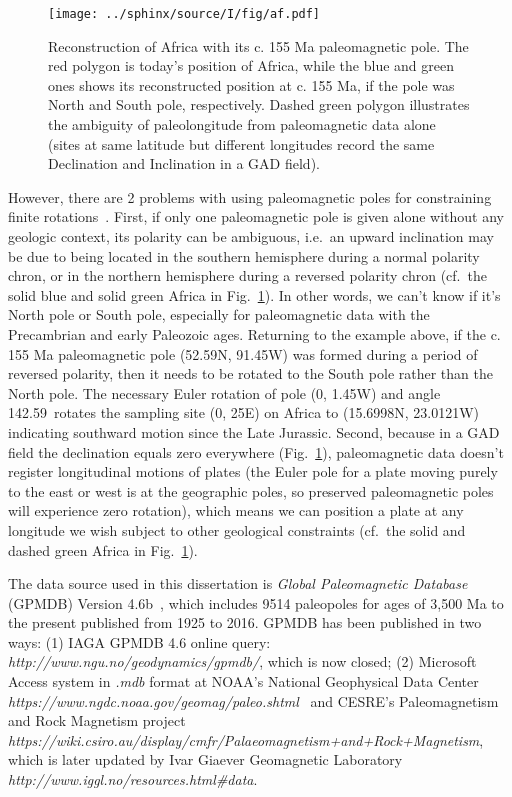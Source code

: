 \begin{figure}
  \centering
    \texttt{[image: ../sphinx/source/I/fig/af.pdf]}
  \captionsetup{width=.95\textwidth}
  \caption{Reconstruction of Africa with its c. 155 Ma paleomagnetic pole. The
  red polygon is today's position of Africa, while the blue and green ones shows
  its reconstructed position at c. 155 Ma, if the pole was North and South pole,
  respectively. Dashed green polygon illustrates the ambiguity of paleolongitude
  from paleomagnetic data alone (sites at same latitude but different longitudes
  record the same Declination and Inclination in a GAD
  field).}\label{Fig:chap_intro_reconstructpole}
\end{figure}

However, there are 2 problems with using paleomagnetic poles for constraining
finite rotations~\cite{T19}. First, if only one paleomagnetic pole is
given alone without any geologic context, its polarity can be ambiguous, i.e.\
an upward inclination may be due to being located in the southern hemisphere
during a normal polarity chron, or in the northern hemisphere during a reversed
polarity chron (cf.\ the solid blue and solid green Africa in Fig.~\ref{Fig:chap_intro_reconstructpole}). In other words, we can't know if it's North pole
or South pole, especially for paleomagnetic data with the Precambrian and early
Paleozoic ages. Returning to the example above, if the c. 155 Ma paleomagnetic
pole (52.59\degree{}N, 91.45\degree{}W) was formed during a period of reversed polarity, then
it needs to be rotated to the South pole rather than the North pole. The
necessary Euler rotation of pole (0\degree, 1.45\degree{}W) and angle
142.59\degree\ rotates the sampling site (0\degree, 25\degree{}E) on Africa to
(15.6998\degree{}N, 23.0121\degree{}W) indicating
southward motion since the Late Jurassic. Second, because in a GAD field the
declination equals zero everywhere (Fig.~\ref{Fig:chap_intro_reconstructpole}),
paleomagnetic data doesn't register longitudinal motions of plates (the Euler
pole for a plate moving purely to the east or west is at the geographic poles,
so preserved paleomagnetic poles will experience zero rotation), which means we
can position a plate at any longitude we wish subject to other geological
constraints (cf.\ the solid and dashed green Africa in Fig.~\ref{Fig:chap_intro_reconstructpole}).

The data source used in this dissertation is \emph{Global Paleomagnetic
Database} (GPMDB) Version 4.6b~\cite[updated in 2016 by the Ivar Giaever
Geomagnetic Laboratory team, in collaboration with Pisarevsky]{P05}, which
includes 9514 paleopoles for ages of 3,500 Ma to the present published from 1925
to 2016. GPMDB has been published in two ways: (1) IAGA GPMDB 4.6 online query:
\emph{http://www.ngu.no/geodynamics/gpmdb/}, which is now closed; (2) Microsoft
Access system in \emph{.mdb} format at NOAA's National Geophysical Data Center
\emph{https://www.ngdc.noaa.gov/geomag/paleo.shtml}~\cite{P03}
and CESRE's Paleomagnetism and Rock Magnetism project
\emph{https://wiki.csiro.au/display/cmfr/Palaeomagnetism+and+Rock+Magnetism},
which is later updated by Ivar Giaever Geomagnetic Laboratory
\emph{http://www.iggl.no/resources.html\#data}.

